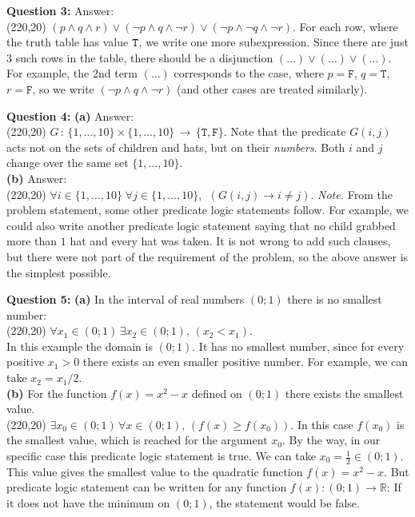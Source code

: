 \documentclass[jou]{apa6}
\begin{document}
\vspace{10pt}
{\bf Question 3:} Answer:\\[5pt]
\framebox(220,20){
$(p \wedge q \wedge r) \vee (\neg p \wedge q \wedge \neg r) \vee (\neg p \wedge \neg q \wedge \neg r).$
}
For each row, where the truth table has value ${\tt T}$, we write one more
subexpression. Since there are just $3$ such rows in the table, 
there should be a disjunction $(\ldots) \vee (\ldots) \vee (\ldots)$. 
For example, the 2nd term $(\ldots)$ corresponds to the case, where $p = \mathtt{F}$, 
$q = \mathtt{T}$, $r = \mathtt{F}$, so we write $(\neg p \wedge q \wedge \neg r)$ (and other cases
are treated similarly).

\vspace{10pt}
{\bf Question 4:} {\bf (a)} Answer:\\[5pt]
\framebox(220,20){
$G\,:\, \{ 1,\ldots,10\} \times \{ 1,\ldots,10\} 
\,\rightarrow\, \{ \mathtt{T}, \mathtt{F} \}$.
}
Note that the predicate $G(i,j)$ acts not on the sets of children and hats, but 
on their {\em numbers}. Both $i$ and $j$ change over the same set $\{ 1,\ldots,10\}$.\\
{\bf (b)} Answer:\\[5pt]
\framebox(220,20){
$\forall i \in \{ 1,\ldots,10\}\; \forall j \in \{ 1,\ldots,10\},\; \,\left( G(i,j) \rightarrow i \neq j \right).$
}
{\em Note.} From the problem statement, some other predicate logic statements follow.
For example, we could also write another predicate logic statement saying that no child 
grabbed more than $1$ hat and every hat was taken. It is not wrong to add such clauses, 
but there were not part of the requirement of the problem, so the above answer is the 
simplest possible.

\vspace{10pt}
{\bf Question 5:} 
{\bf (a)} In the interval of real numbers $(0;1)$ there is no smallest number:\\[5pt]
\framebox(220,20){
$\forall x_1 \in (0;1)\, \exists x_2 \in (0;1),\, \left( x_2 < x_1 \right)$.
}\\
In this example the domain is $(0;1)$. It has no smallest number, since for every positive $x_1 > 0$
there exists an even smaller positive number. For example, we can take $x_2 = x_1/2$.\\
{\bf (b)} For the function $f(x) = x^2 - x$ defined on $(0;1)$ there exists the smallest value.\\[5pt]
\framebox(220,20){
$\exists x_0 \in (0;1)\,\forall x \in (0;1),\,\left( f(x) \geq f(x_0) \right)$.
}
In this case $f(x_0)$ is the smallest value, which is reached for the argument $x_0$. 
By the way, in our specific case this predicate logic statement is true. 
We can take $x_0 = \frac{1}{2} \in (0;1)$. This value gives the smallest value to 
the quadratic function $f(x) = x^2 - x$. But predicate logic statement can be written for 
any function $f(x): (0;1)\rightarrow \mathbb{R}$: 
If it does not have the minimum on $(0;1)$, the statement would be false.
\end{document}
